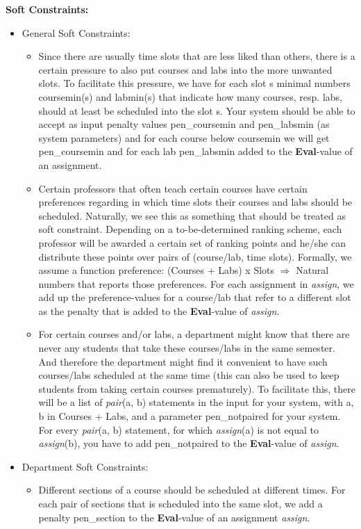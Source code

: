 \documentclass[11pt, oneside]{article}   	%
\begin{document}
\noindent \textbf{Soft Constraints:}
\begin{itemize}[topsep=0pt, itemsep=0pt]
\item General Soft Constraints:
    \begin{itemize}[topsep=0pt, itemsep=0pt]
    \item Since there are usually time slots that are less liked than others, there is a certain pressure to also put courses and labs into the more unwanted slots. To facilitate this pressure, we have for each slot s minimal numbers coursemin(s) and labmin(s) that indicate how many courses, resp. labs, should at least be scheduled into the slot s. Your system should be able to accept as input penalty values pen_coursemin and pen_labsmin (as system parameters) and for each course below coursemin we will get pen_coursemin and for each lab pen_labsmin added to the \textbf{Eval}-value of an assignment.
    \item Certain professors that often teach certain courses have certain preferences regarding in which time slots their courses and labs should be scheduled. Naturally, we see this as something that should be treated as soft constraint. Depending on a to-be-determined ranking scheme, each professor will be awarded a certain set of ranking points and he/she can distribute these points over pairs of (course/lab, time slots). Formally, we assume a function preference: (Courses + Labs) x Slots $\Rightarrow$ Natural numbers that reports those preferences. For each assignment in \textit{assign}, we add up the preference-values for a course/lab that refer to a different slot as the penalty that is added to the \textbf{Eval}-value of \textit{assign}.
    \item For certain courses and/or labs, a department might know that there are never any students that take these courses/labs in the same semester. And therefore the department might find it convenient to have such courses/labs scheduled at the same time (this can also be used to keep students from taking certain courses prematurely). To facilitate this, there will be a list of \textit{pair}(a, b) statements in the input for your system, with a, b in Courses + Labs, and a parameter pen_notpaired for your system. For every \textit{pair}(a, b) statement, for which \textit{assign}(a) is not equal to \textit{assign}(b), you have to add pen_notpaired to the \textbf{Eval}-value of \textit{assign}.
    \end{itemize}
\item Department Soft Constraints:
    \begin{itemize}[topsep=0pt, itemsep=0pt]
    \item Different sections of a course should be scheduled at different times. For each pair of sections that is scheduled into the same slot, we add a penalty pen\_section to the \textbf{Eval}-value of an assignment \textit{assign}.
    \end{itemize}
\end{itemize}
\break
\end{document}
